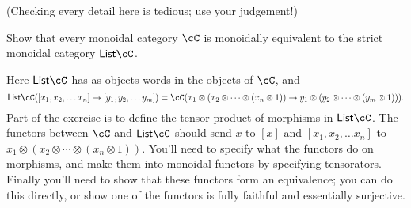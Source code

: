 \documentclass[11pt]{article}
\begin{document}
\begin{exercise}
(Checking every detail here is tedious; use your judgement!)

Show that every monoidal category $\cC$ is monoidally equivalent to the strict monoidal category $\mathsf{List} \cC$.

Here $\mathsf{List} \cC$ has as objects words in the objects of $\cC$, and $$\mathsf{List} \cC([x_1, x_2, \ldots x_n] \to [y_1, y_2, \ldots y_m]) = \cC(x_1 \otimes (x_2 \otimes \cdots \otimes (x_n \otimes 1)) \to y_1 \otimes (y_2 \otimes \cdots \otimes (y_m \otimes 1))).$$ Part of the exercise is to define the tensor product of morphisms in $\mathsf{List} \cC$. The functors between $\cC$ and $\mathsf{List} \cC$ should send $x$ to $[x]$ and $[x_1, x_2, \ldots x_n]$ to $x_1 \otimes (x_2 \otimes \cdots \otimes (x_n \otimes 1))$. You'll need to specify what the functors do on morphisms, and make them into monoidal functors by specifying tensorators. Finally you'll need to show that these functors form an equivalence; you can do this directly, or show one of the functors is fully faithful and essentially surjective.
\end{exercise}
\end{document}
